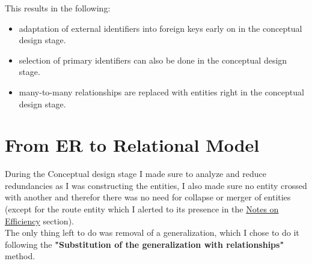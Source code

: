 \documentclass[12pt]{scrartcl}
\begin{document}
This results in the following:
\begin{itemize}
	\item adaptation of external identifiers into foreign keys early on in the conceptual design stage.
	\item selection of primary identifiers can also be done in the conceptual design stage.
	\item many-to-many relationships are replaced with entities right in the conceptual design stage.
\end{itemize}

\newpage

\newpage

\newpage
\section*{\normalsize{From ER to Relational Model}}
During the Conceptual design stage I made sure to analyze and reduce redundancies as I was constructing the entities, I also made sure no entity crossed with another and therefor there was no need for collapse or merger of entities (except for the route entity which I alerted to its presence in the \hyperlink{page.13}{Notes on Efficiency} section).\\

The only thing left to do was removal of a generalization, which I chose to do it following the \textbf{"Substitution of the generalization with relationships"} method.\\
\end{document}
